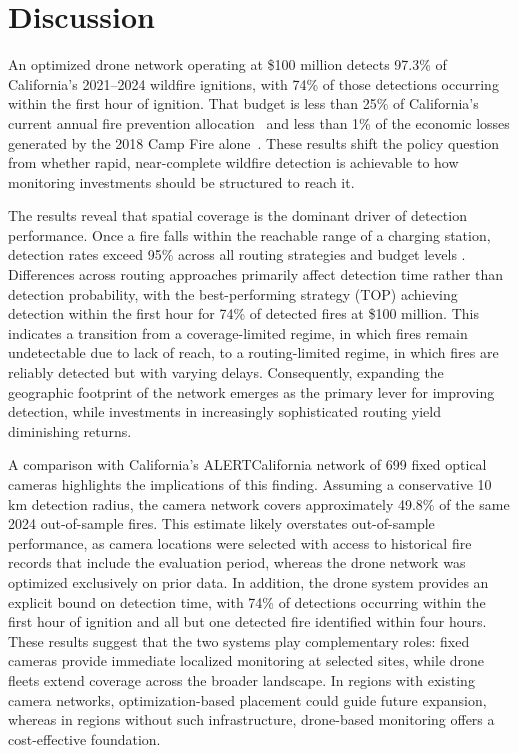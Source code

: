 \documentclass[pdflatex,sn-mathphys-num]{sn-jnl}%
\theoremstyle{thmstyleone}%
\theoremstyle{thmstyletwo}%
\theoremstyle{thmstylethree}%
\begin{document}

\FloatBarrier
\newpage
\section*{Discussion}

An optimized drone network operating at \$100 million detects 97.3\% of California's 2021--2024 wildfire ignitions, with 74\% of those detections occurring within the first hour of ignition. That budget is less than 25\% of California's current annual fire prevention allocation~\citep{next10_rebuilding_resilient_2021} and less than 1\% of the economic losses generated by the 2018 Camp Fire alone~\citep{hamideh2022wildfire}. These results shift the policy question from whether rapid, near-complete wildfire detection is achievable to how monitoring investments should be structured to reach it.

The results reveal that spatial coverage is the dominant driver of detection performance. Once a fire falls within the reachable range of a charging station, detection rates exceed 95\% across all routing strategies and budget levels . Differences across routing approaches primarily affect detection time rather than detection probability, with the best-performing strategy (TOP) achieving detection within the first hour for 74\% of detected fires at \$100 million. This indicates a transition from a coverage-limited regime, in which fires remain undetectable due to lack of reach, to a routing-limited regime, in which fires are reliably detected but with varying delays. Consequently, expanding the geographic footprint of the network emerges as the primary lever for improving detection, while investments in increasingly sophisticated routing yield diminishing returns.

A comparison with California's ALERTCalifornia network of 699 fixed optical cameras highlights the implications of this finding. Assuming a conservative 10 km detection radius, the camera network covers approximately 49.8\% of the same 2024 out-of-sample fires. This estimate likely overstates out-of-sample performance, as camera locations were selected with access to historical fire records that include the evaluation period, whereas the drone network was optimized exclusively on prior data. In addition, the drone system provides an explicit bound on detection time, with 74\% of detections occurring within the first hour of ignition and all but one detected fire identified within four hours. These results suggest that the two systems play complementary roles: fixed cameras provide immediate localized monitoring at selected sites, while drone fleets extend coverage across the broader landscape. In regions with existing camera networks, optimization-based placement could guide future expansion, whereas in regions without such infrastructure, drone-based monitoring offers a cost-effective foundation.
\end{document}
